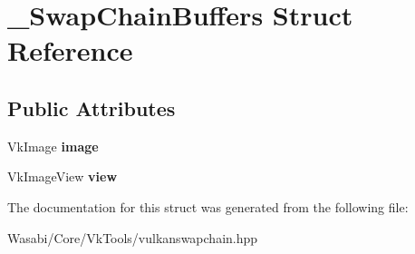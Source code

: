 \hypertarget{struct___swap_chain_buffers}{}\section{\+\_\+\+Swap\+Chain\+Buffers Struct Reference}
\label{struct___swap_chain_buffers}
\subsection*{Public Attributes}
\begin{DoxyCompactItemize}
\item 
Vk\+Image {\bfseries image}\hypertarget{struct___swap_chain_buffers_aaab0c38ab807bbe98cbcb81ffdbb5d29}{}\label{struct___swap_chain_buffers_aaab0c38ab807bbe98cbcb81ffdbb5d29}

\item 
Vk\+Image\+View {\bfseries view}\hypertarget{struct___swap_chain_buffers_a14ea928ade2124e102fdee7403da13cd}{}\label{struct___swap_chain_buffers_a14ea928ade2124e102fdee7403da13cd}

\end{DoxyCompactItemize}


The documentation for this struct was generated from the following file\+:\begin{DoxyCompactItemize}
\item 
Wasabi/\+Core/\+Vk\+Tools/vulkanswapchain.\+hpp\end{DoxyCompactItemize}
